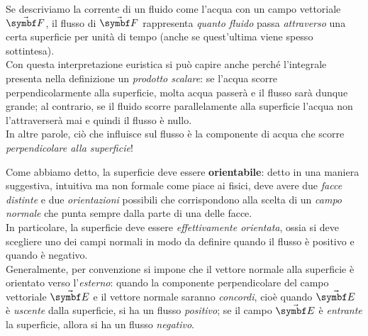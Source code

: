 \begin{intuit}
	Se descriviamo la corrente di un fluido come l'acqua con un campo vettoriale $\vba{F}$, il flusso di $\vba{F}$ rappresenta \textit{quanto fluido} passa \textit{attraverso} una certa superficie per unità di tempo (anche se quest'ultima viene spesso sottintesa).\\
	Con questa interpretazione euristica si può capire anche perché l'integrale presenta nella definizione un \textit{prodotto scalare}: se l'acqua scorre perpendicolarmente alla superficie, molta acqua passerà e il flusso sarà dunque grande; al contrario, se il fluido scorre parallelamente alla superficie l'acqua non l'attraverserà mai e quindi il flusso è nullo.\\
	In altre parole, ciò che influisce sul flusso è la componente di acqua che scorre \textit{perpendicolare alla superficie}!
\end{intuit}
\noindent Come abbiamo detto, la superficie deve essere \textbf{orientabile}: detto in una maniera suggestiva, intuitiva ma non formale come piace ai fisici, deve avere due \textit{facce distinte} e due \textit{orientazioni} possibili che corrispondono alla scelta di un \textit{campo normale} che punta sempre dalla parte di una delle facce.\\
In particolare, la superficie deve essere \textit{effettivamente orientata}, ossia si deve scegliere uno dei campi normali in modo da definire quando il flusso è positivo e quando è negativo.\\
Generalmente, per convenzione si impone che il vettore normale alla superficie è orientato verso l'\textit{esterno}: quando la componente perpendicolare del campo vettoriale $\vba{E}$ e il vettore normale saranno \textit{concordi}, cioè quando $\vba{E}$ è \textit{uscente} dalla superficie, si ha un flusso \textit{positivo}; se il campo $\vba{E}$ è \textit{entrante} la superficie, allora si ha un flusso \textit{negativo}.
